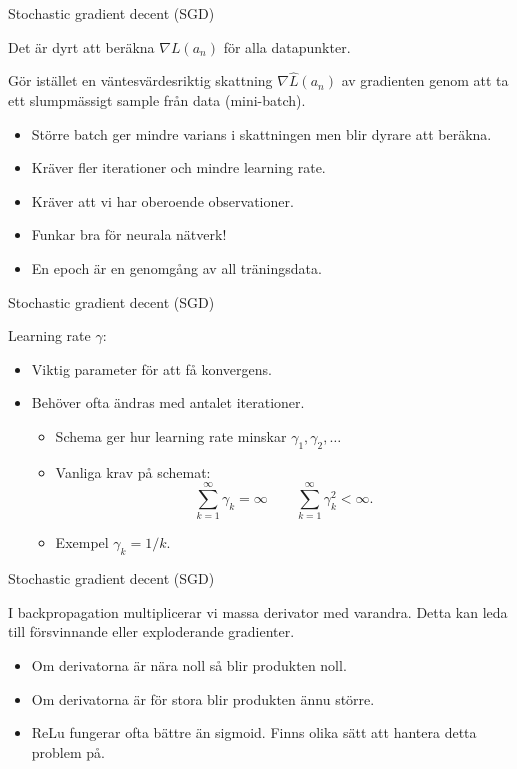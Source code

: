 \documentclass[10pt,english]{beamer}
\begin{document}
\begin{frame}{Stochastic gradient decent (SGD)}

    Det är dyrt att beräkna $\nabla L(a_n)$ för alla datapunkter.

    Gör istället en väntesvärdesriktig skattning $\nabla \hat{L}(a_n)$ av gradienten genom att ta ett slumpmässigt sample från data (mini-batch).

    \begin{itemize}
        \item Större batch ger mindre varians i skattningen men blir dyrare att beräkna.
        \item Kräver fler iterationer och mindre learning rate.
        \item Kräver att vi har oberoende observationer.
        \item Funkar bra för neurala nätverk!
        \item En epoch är en genomgång av all träningsdata.
    \end{itemize}
    
\end{frame}

\begin{frame}{Stochastic gradient decent (SGD)}
    
    Learning rate $\gamma$:
    \begin{itemize}
        \item Viktig parameter för att få konvergens.
        \item Behöver ofta ändras med antalet iterationer.
        \begin{itemize}
            \item Schema ger hur learning rate minskar $\gamma_1, \gamma_2, \ldots$
            \item Vanliga krav på schemat:
            \begin{equation*}
                \sum_{k=1}^{\infty} \gamma_k = \infty \qquad \sum_{k=1}^{\infty} \gamma_k^2 < \infty.
            \end{equation*}
            \item Exempel $\gamma_k = 1/k$.
        \end{itemize}
    \end{itemize}

\end{frame}

\begin{frame}{Stochastic gradient decent (SGD)}
    
     I backpropagation multiplicerar vi massa derivator med varandra. Detta kan leda till försvinnande eller exploderande gradienter.
    \begin{itemize}
        \item Om derivatorna är nära noll så blir produkten noll.
        \item Om derivatorna är för stora blir produkten ännu större.
        \item ReLu fungerar ofta bättre än sigmoid. Finns olika sätt att hantera detta problem på.
    \end{itemize}

\end{frame}
\end{document}
